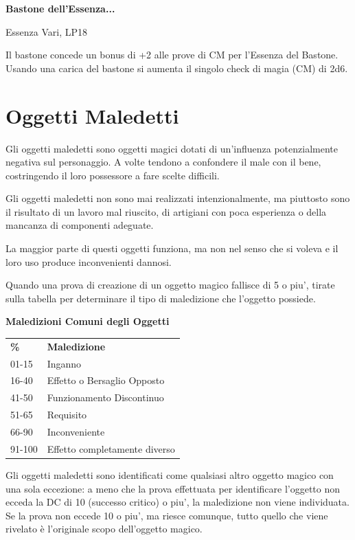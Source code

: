 \documentclass[a4paper,11pt,twoside,openany]{book}
\begin{document}
\textbf{Bastone dell'Essenza...}

Essenza Vari, LP18

Il bastone concede un bonus di +2 alle prove di CM per l'Essenza del Bastone. Usando una carica del bastone si aumenta il singolo check di magia (CM) di 2d6.

\pagebreak

\section{Oggetti Maledetti}

\label{oggetti-maledetti}

Gli oggetti maledetti sono oggetti magici dotati di un'influenza potenzialmente negativa sul personaggio. A volte tendono a confondere il male con il bene, costringendo il loro possessore a fare scelte difficili.

Gli oggetti maledetti non sono mai realizzati intenzionalmente, ma piuttosto sono il risultato di un lavoro mal riuscito, di artigiani con poca esperienza o della mancanza di componenti adeguate.

La maggior parte di questi oggetti funziona, ma non nel senso che si voleva e il loro uso produce inconvenienti dannosi.

Quando una prova di creazione di un oggetto magico fallisce di 5 o piu', tirate sulla tabella per determinare il tipo di maledizione che l'oggetto possiede.

\bigskip

\textbf{Maledizioni Comuni degli Oggetti}

\medskip
\begin{tabular}{ll}
	\toprule
	\textbf{\%} & \textbf{Maledizione}\\
	01-15       & Inganno\\
	16-40       & Effetto o Bersaglio Opposto\\
	41-50       & Funzionamento Discontinuo\\
	51-65       & Requisito\\
	66-90       & Inconveniente\\
	91-100      & Effetto completamente diverso\\
\end{tabular}

\bigskip

Gli oggetti maledetti sono identificati come qualsiasi altro oggetto magico con una sola eccezione: a meno che la prova effettuata per identificare l'oggetto non ecceda la DC di 10 (successo critico) o piu', la maledizione non viene individuata. Se la prova non eccede 10 o piu', ma riesce comunque, tutto quello che viene rivelato è l'originale scopo dell'oggetto magico.
\end{document}
